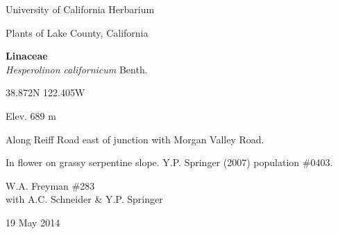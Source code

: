 \documentclass[letterpaper,10pt]{article}
\begin{document}
\begin{minipage}[t]{0.40\textwidth}

\begin{center}
University of California Herbarium \\
\begin{large}
Plants of Lake County, California \\
\end{large}
\vspace{\baselineskip}
\textbf{Linaceae} \\
\textit{Hesperolinon californicum} Benth.\\
\end{center}

\begin{footnotesize}

\begin{multicols}{2}
38.872\textdegree N 122.405\textdegree W
\columnbreak
\begin{flushright}
Elev. 689 m
\end{flushright}
\end{multicols}

Along Reiff Road east of junction with Morgan Valley Road.
\vspace{\baselineskip}

In flower on grassy serpentine slope. Y.P. Springer (2007) population \#0403.

\begin{multicols}{2}
W.A. Freyman \#283 \\
with A.C. Schneider \& Y.P. Springer
\columnbreak
\begin{flushright}
19 May 2014
\end{flushright}
\end{multicols}

\end{footnotesize}

\end{minipage}

\vspace{2cm}
%
%

%
%
\end{document}
